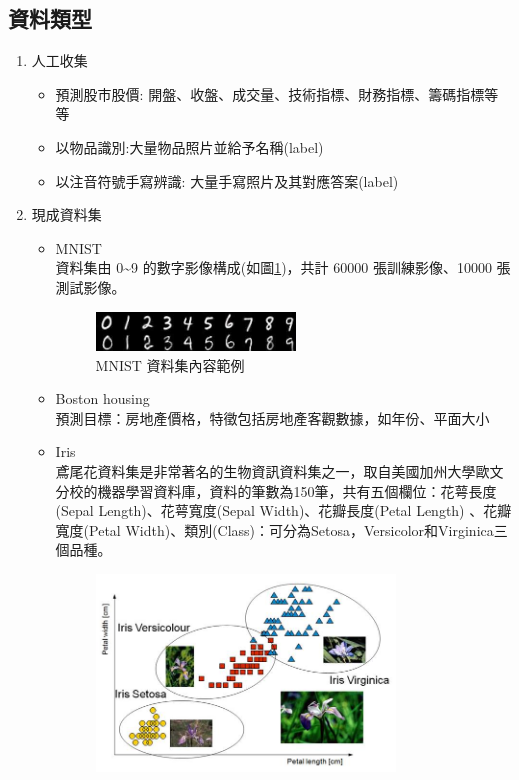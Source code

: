 \documentclass[a4paper,12pt]{article}
\begin{document}
\subsection{資料類型}
\label{sec:orgb216a64}
\begin{enumerate}
\item 人工收集
\label{sec:org5c6d5ea}
\begin{itemize}
\item 預測股市股價: 開盤、收盤、成交量、技術指標、財務指標、籌碼指標等等\\
\item 以物品識別:大量物品照片並給予名稱(label)\\
\item 以注音符號手寫辨識: 大量手寫照片及其對應答案(label)\\
\end{itemize}
\item 現成資料集
\label{sec:orgc1b8fdf}
\begin{itemize}
\item MNIST\\
資料集由 0\textasciitilde{}9 的數字影像構成(如圖\ref{fig:MNIST-set})，共計 60000 張訓練影像、10000 張測試影像。\\
\begin{figure}[htbp]
\centering
\includegraphics[width=200]{images/MNIST.jpg}
\caption{\label{fig:MNIST-set}MNIST 資料集內容範例}
\end{figure}
\item Boston housing\\
預測目標：房地產價格，特徵包括房地產客觀數據，如年份、平面大小\\
\item Iris\\
鳶尾花資料集是非常著名的生物資訊資料集之一，取自美國加州大學歐文分校的機器學習資料庫，資料的筆數為150筆，共有五個欄位：花萼長度(Sepal Length)、花萼寬度(Sepal Width)、花瓣長度(Petal Length) 、花瓣寬度(Petal Width)、類別(Class)：可分為Setosa，Versicolor和Virginica三個品種。\\
\begin{figure}[htbp]
\centering
\includegraphics[width=300]{images/cqy409dEexm96zavyuw.png}

\end{figure}
\end{itemize}
\end{enumerate}
\end{document}
